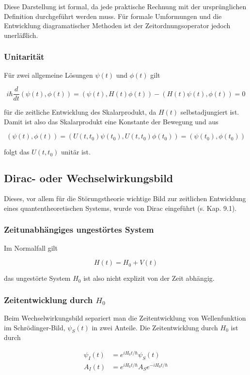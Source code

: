 \documentclass[10pt, letterpaper]{article}
\begin{document}
Diese Darstellung ist formal, da jede praktische Rechnung mit der ursprünglichen Definition durchgeführt werden muss. Für formale Umformungen und die Entwicklung diagramatischer Methoden ist der Zeitordnungsoperator jedoch unerläßlich.

\subsubsection*{Unitarität}
Für zwei allgemeine Lösungen $\psi(t)$ und $\phi(t)$ gilt

$$
i \hbar \frac{d}{d t}(\psi(t), \phi(t))=(\psi(t), H(t) \phi(t))-(H(t) \psi(t), \phi(t))=0
$$

für die zeitliche Entwicklung des Skalarprodukt, da $H(t)$ selbstadjungiert ist. Damit ist also das Skalarprodukt eine Konstante der Bewegung und aus

$$
(\psi(t), \phi(t))=\left(U\left(t, t_{0}\right) \psi\left(t_{0}\right), U\left(t, t_{0}\right) \phi\left(t_{0}\right)\right)=\left(\psi\left(t_{0}\right), \phi\left(t_{0}\right)\right)
$$

folgt das $U\left(t, t_{0}\right)$ unitär ist.

\subsection*{Dirac- oder Wechselwirkungsbild}
Dieses, vor allem für die Störungstheorie wichtige Bild zur zeitlichen Entwicklung eines quantentheoretischen Systems, wurde von Dirac eingeführt (s. Kap. 9.1).

\subsubsection*{Zeitunabhängiges ungestörtes System}
Im Normalfall gilt

$$
H(t)=H_{0}+V(t)
$$

das ungestörte System $H_{0}$ ist also nicht explizit von der Zeit abhängig.

\subsubsection*{Zeitentwicklung durch $H_{0}$}
Beim Wechselwirkungsbild separiert man die Zeitentwicklung von Wellenfunktion im Schrödinger-Bild, $\psi_{S}(t)$ in zwei Anteile. Die Zeitentwicklung durch $H_{0}$ ist durch

$$
\begin{aligned}
\psi_{I}(t) & =e^{i H_{0} t / \hbar} \psi_{S}(t) \\
A_{I}(t) & =e^{i H_{0} t / \hbar} A_{S} e^{-i H_{0} t / \hbar}
\end{aligned}
$$
\end{document}
